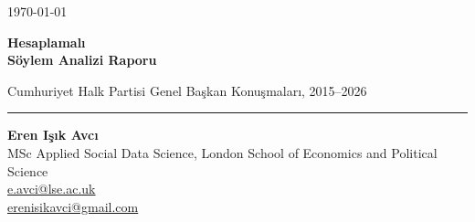 \documentclass[12pt,a4paper]{article}
\newcommand{\reporttitle}{Hesaplamalı \\ Söylem Analizi Raporu}
\newcommand{\reportsubtitle}{Cumhuriyet Halk Partisi Genel Başkan Konuşmaları, 2015--2026}
\newcommand{\reportauthor}{Eren Işık Avcı}
\newcommand{\reportdate}{\today}
\begin{document}
\thispagestyle{empty}
\vspace*{4cm}

{\color{muted}\large \reportdate}

\vspace{0.7em}
{\fontsize{28}{32}\selectfont\bfseries \reporttitle\par}

\vspace{0.5em}
{\Large\color{muted} \reportsubtitle\par}

\vspace{1.3em}
{\color{ink}\rule{5cm}{2pt}}

\vfill

{\large\bfseries \reportauthor}\\[0.3em]
{\color{muted}
MSc Applied Social Data Science, London School of Economics and Political Science\\
\href{mailto:e.avci@lse.ac.uk}{e.avci@lse.ac.uk} \\
\href{mailto:erenisikavci@gmail.com}{erenisikavci@gmail.com}
}

\vspace{2cm}

\newpage
\thispagestyle{empty}
\tableofcontents



\newpage
\setcounter{page}{1}

















\end{document}
